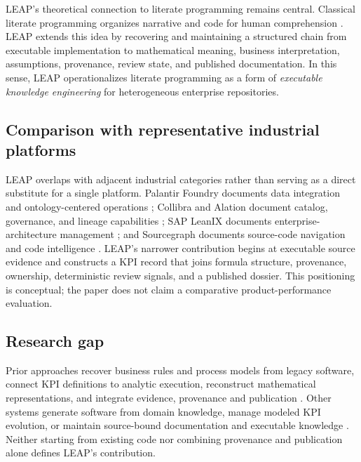 \documentclass[a4paper,fleqn]{cas-dc}
\begin{document}
LEAP's theoretical connection to literate programming remains central. Classical literate programming organizes narrative and code for human comprehension \citep{Knuth1984}. LEAP extends this idea by recovering and maintaining a structured chain from executable implementation to mathematical meaning, business interpretation, assumptions, provenance, review state, and published documentation. In this sense, LEAP operationalizes literate programming as a form of \emph{executable knowledge engineering} for heterogeneous enterprise repositories.

\subsection{Comparison with representative industrial platforms}
\label{sec:platform-comparison}

LEAP overlaps with adjacent industrial categories rather than serving as a direct substitute for a single platform. Palantir Foundry documents data integration and ontology-centered operations \citep{PalantirDocs}; Collibra and Alation document catalog, governance, and lineage capabilities \citep{CollibraDocs,AlationDocs}; SAP LeanIX documents enterprise-architecture management \citep{LeanIXDocs}; and Sourcegraph documents source-code navigation and code intelligence \citep{SourcegraphDocs}. LEAP's narrower contribution begins at executable source evidence and constructs a KPI record that joins formula structure, provenance, ownership, deterministic review signals, and a published dossier. This positioning is conceptual; the paper does not claim a comparative product-performance evaluation.


\subsection{Research gap}

Prior approaches recover business rules and process models from legacy software, connect KPI definitions to analytic execution, reconstruct mathematical representations, and integrate evidence, provenance and publication \citep{PutryczKark2008,PerezCastillo2011MARBLE,Chittimalli2019SBVR,Mate2017,Moser2015,Moseler2021,Brush2016SEPIO,Psallidas2023OneProvenance,Sadiq2026ESDPKI}. Other systems generate software from domain knowledge, manage modeled KPI evolution, or maintain source-bound documentation and executable knowledge \citep{Carette2023,DeSanctis2022,Dominguez2025,Kelious2026,Gao2026}. Neither starting from existing code nor combining provenance and publication alone defines LEAP's contribution.
\end{document}
